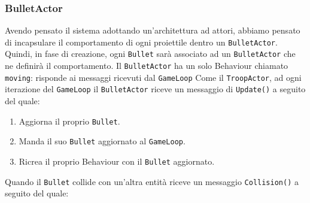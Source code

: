 \subsubsection{BulletActor}
Avendo pensato il sistema adottando un'architettura ad attori, abbiamo pensato di incapsulare il comportamento
di ogni proiettile dentro un \texttt{BulletActor}. Quindi, in fase di creazione, ogni \texttt{Bullet} sarà associato ad un
\texttt{BulletActor} che ne definirà il comportamento.
Il \texttt{BulletActor} ha un solo Behaviour chiamato \texttt{moving}: risponde ai messaggi ricevuti dal \texttt{GameLoop}
Come il \texttt{TroopActor}, ad ogni iterazione del \texttt{GameLoop} il \texttt{BulletActor} riceve un messaggio di \texttt{Update()} a seguito del quale:
\begin{enumerate}
    \item Aggiorna il proprio \texttt{Bullet}.
    \item Manda il suo \texttt{Bullet} aggiornato al \texttt{GameLoop}.
    \item Ricrea il proprio Behaviour con il \texttt{Bullet} aggiornato.
\end{enumerate}
Quando il \texttt{Bullet} collide con un'altra entità riceve un messaggio \texttt{Collision()} a seguito del quale:
